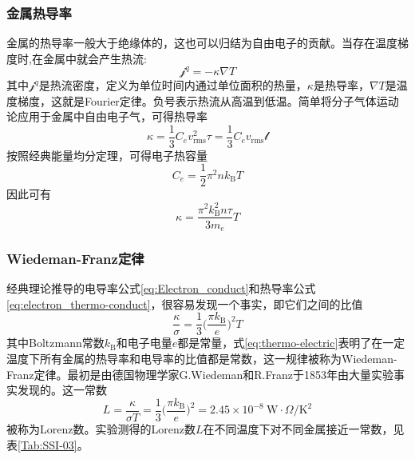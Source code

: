 \subsubsection{金属热导率} 
金属的热导率一般大于绝缘体的，这也可以归结为自由电子的贡献。当存在温度梯度时,在金属中就会产生热流:
\begin{equation}
	\mathscr{j}^q=-\kappa\nabla T
	\label{eq:thermo_current}
\end{equation} 
其中$\mathscr{j}^q$是热流密度，定义为单位时间内通过单位面积的热量，$\kappa$是热导率，$\nabla T$是温度梯度，这就是Fourier定律。负号表示热流从高温到低温。简单将分子气体运动论应用于金属中自由电子气，可得热导率
\begin{equation}
	\kappa=\dfrac13C_ev_{\mathrm{rms}}^2\tau=\dfrac13C_ev_{\mathrm{rms}}\mathscr{l}
	\label{eq:thermo_conduct}
\end{equation}
按照经典能量均分定理，可得电子热容量
\begin{equation}
	C_e=\dfrac12\pi^2nk_{\mathrm{B}}T
	\label{eq:electron_thermo-capacity}
\end{equation}
因此可有
\begin{equation}
	\kappa=\dfrac{\pi^2k_{\mathrm{B}}^2n\tau}{3m_e}T
	\label{eq:electron_thermo-conduct}
\end{equation}
\subsubsection{Wiedeman-Franz定律}
经典理论推导的电导率公式\eqref{eq:Electron_conduct}和热导率公式\eqref{eq:electron_thermo-conduct}，很容易发现一个事实，即它们之间的比值
\begin{equation}
	\dfrac{\kappa}{\sigma}=\dfrac13\bigg(\dfrac{\pi k_{\mathrm{B}}}e\bigg)^2T
	\label{eq:thermo-electric}
\end{equation}
其中Boltzmann常数$k_{\mathrm{B}}$和电子电量$e$都是常量，式\eqref{eq:thermo-electric}表明了在一定温度下所有金属的热导率和电导率的比值都是常数，这一规律被称为Wiedeman-Franz定律。最初是由德国物理学家G.Wiedeman和R.Franz于1853年由大量实验事实发现的。这一常数
\begin{equation}
	L=\dfrac{\kappa}{\sigma T}=\dfrac13\bigg(\dfrac{\pi k_{\mathrm{B}}}e\bigg)^2=2.45\times10^{-8}~\mathrm{W}\cdot\Omega/\mathrm{K}^2
	\label{eq:Wiedeman-Franz}
\end{equation} 
被称为Lorenz数。实验测得的Lorenz数$L$在不同温度下对不同金属接近一常数，见表\ref{Tab:SSI-03}。

